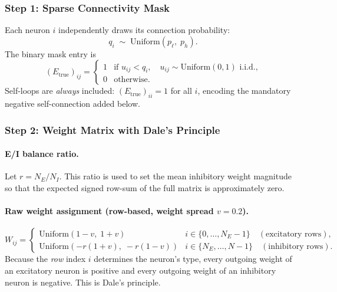 \documentclass[11pt]{article}
\begin{document}
\subsubsection{Step 1: Sparse Connectivity Mask}
\label{sec:mask}

Each neuron $i$ independently draws its connection probability:
\begin{equation}
  q_i \;\sim\; \mathrm{Uniform}(p_\ell,\; p_h).
\end{equation}
The binary mask entry is
\begin{equation}
  (E_{\text{true}})_{ij} =
  \begin{cases}
    1 & \text{if } u_{ij} < q_i, \quad
        u_{ij} \sim \mathrm{Uniform}(0,1) \text{ i.i.d.,} \\
    0 & \text{otherwise.}
  \end{cases}
\end{equation}
Self-loops are \emph{always} included: $(E_{\text{true}})_{ii} = 1$
for all $i$, encoding the mandatory negative self-connection added below.

\subsubsection{Step 2: Weight Matrix with Dale's Principle}
\label{sec:weights}

\paragraph{E/I balance ratio.}
Let $r = N_E / N_I$.
This ratio is used to set the mean inhibitory weight magnitude so
that the expected signed row-sum of the full matrix is
approximately zero.

\paragraph{Raw weight assignment (row-based, weight spread $v = 0.2$).}
\begin{equation}
  W_{ij} =
  \begin{cases}
    \mathrm{Uniform}(1-v,\; 1+v) &
      i \in \{0,\dots,N_E-1\} \quad (\text{excitatory rows}), \\[4pt]
    \mathrm{Uniform}(-r(1+v),\; -r(1-v)) &
      i \in \{N_E,\dots,N-1\} \quad (\text{inhibitory rows}).
  \end{cases}
  \label{eq:raw_weights}
\end{equation}
Because the \emph{row} index $i$ determines the neuron's type, every
outgoing weight of an excitatory neuron is positive and every
outgoing weight of an inhibitory neuron is negative.  This is
Dale's principle.
\end{document}
